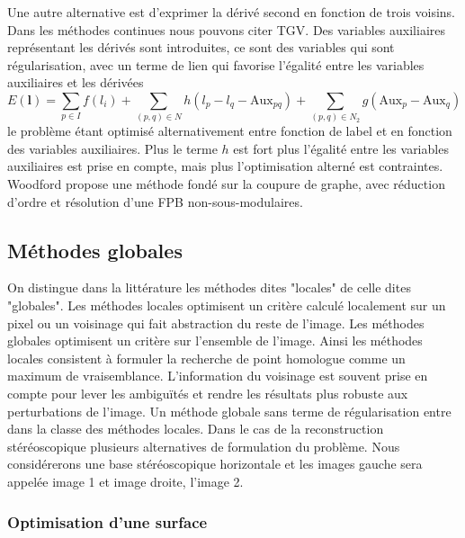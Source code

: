 \documentclass[../main/These_Mathias_Paget.tex]{subfiles}
\begin{document}
Une autre alternative est d'exprimer la dérivé second en fonction de trois voisins. Dans les méthodes continues nous pouvons citer TGV. Des variables auxiliaires représentant les dérivés sont introduites, ce sont des variables qui sont régularisation, avec un terme de lien qui favorise l’égalité entre les variables auxiliaires et les dérivées
\begin{equation}
E(\boldsymbol{l}) = \sum_{p \in I}{f(l_i)} + \sum_{(p,q) \in N}{h(l_p{-}l_q-\text{Aux}_{pq})} + \sum_{(p,q) \in N_2}{g(\text{Aux}_p-\text{Aux}_q)}
\end{equation}
le problème étant optimisé alternativement entre fonction de label et en fonction des variables auxiliaires. Plus le terme $h$ est fort plus l’égalité entre les variables auxiliaires est prise en compte, mais plus l'optimisation alterné est contraintes. Woodford propose une méthode fondé sur la coupure de graphe, avec réduction d'ordre et résolution d'une FPB non-sous-modulaires.

\subsection{Méthodes globales}
\label{ss:method_global}

On distingue dans la littérature les méthodes dites "locales" de celle dites "globales". Les méthodes locales optimisent un critère calculé localement sur un pixel ou un voisinage qui fait abstraction du reste de l'image. Les méthodes globales optimisent un critère sur l'ensemble de l'image. Ainsi les méthodes locales consistent à formuler la recherche de point homologue comme un maximum de vraisemblance. L'information du voisinage est souvent prise en compte pour lever les ambiguïtés et rendre les résultats plus robuste aux perturbations de l'image. Un méthode globale sans terme de régularisation entre dans la classe des méthodes locales. Dans le cas de la reconstruction stéréoscopique plusieurs alternatives de formulation du problème. Nous considérerons une base stéréoscopique horizontale et les images gauche sera appelée image 1 et image droite, l'image 2.

\subsubsection{Optimisation d'une surface}
\end{document}
